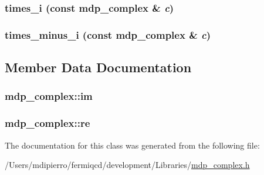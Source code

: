 \label{classmdp__complex_ab967861ba5a992ba73f0aad6e6a80def}
\hypertarget{classmdp__complex_a4c38de484596ed698718b739631e4256}{
\subsubsection[{times\_\-i}]{ times\_\-i (const {\bf mdp\_\-complex} \& {\em c})}}
\label{classmdp__complex_a4c38de484596ed698718b739631e4256}
\hypertarget{classmdp__complex_a0ccefb1f54f375c0f2e23c6f26ecdbbe}{
\subsubsection[{times\_\-minus\_\-i}]{ times\_\-minus\_\-i (const {\bf mdp\_\-complex} \& {\em c})}}
\label{classmdp__complex_a0ccefb1f54f375c0f2e23c6f26ecdbbe}


\subsection{Member Data Documentation}
\hypertarget{classmdp__complex_ab1d9712d92fea8db3d65ccfdee49adaa}{
\subsubsection[{im}]{ {\bf mdp\_\-complex::im}}}
\label{classmdp__complex_ab1d9712d92fea8db3d65ccfdee49adaa}
\hypertarget{classmdp__complex_abd6f1624347c6acca19f089047c1a995}{
\subsubsection[{re}]{ {\bf mdp\_\-complex::re}}}
\label{classmdp__complex_abd6f1624347c6acca19f089047c1a995}


The documentation for this class was generated from the following file:\begin{DoxyCompactItemize}
\item 
/Users/mdipierro/fermiqcd/development/Libraries/\hyperlink{mdp__complex_8h}{mdp\_\-complex.h}\end{DoxyCompactItemize}
